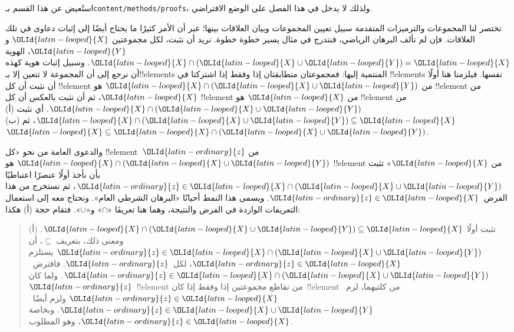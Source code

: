 \documentclass[../../../include/open-logic-section]{subfiles}
\begin{document}

\begin{editorial}
استُعيض عن هذا القسم بـ\verb|content/methods/proofs|، ولذلك لا يدخل في
هذا الفصل على الوضع الافتراضي.
\end{editorial}

\begin{explain}
تختصر لنا المجموعات والترميزات المتقدمة سبيل تعيين المجموعات وبيان
العلاقات بينها؛ غير أن الأمر كثيرًا ما يحتاج أيضًا إلى إثبات دعاوى في
تلك العلاقات. فإن لم تألف البرهان الرياضي، فنتدرج في مثال يسير خطوة
خطوة. نريد أن نثبت، لكل مجموعتين $\OLId{latin-looped}{X}$ و$\OLId{latin-looped}{Y}$، الهوية
$\OLId{latin-looped}{X} \cap (\OLId{latin-looped}{X} \cup \OLId{latin-looped}{Y}) = \OLId{latin-looped}{X}$. وسبيل إثبات هوية كهذه أن نرجع إلى أن المجموعة
لا تتعين إلا بـ!!{element}s المنتمية إليها: فمجموعتان متطابقتان إذا وفقط
إذا اشتركتا في !!{element}s نفسها. فيلزمنا هنا أولًا أن نثبت أن كل
!!{element} من $\OLId{latin-looped}{X} \cap (\OLId{latin-looped}{X} \cup \OLId{latin-looped}{Y})$ هو !!{element} من $\OLId{latin-looped}{X}$، ثم أن نثبت
بالعكس أن كل !!{element} من $\OLId{latin-looped}{X}$ هو !!{element} من
$\OLId{latin-looped}{X} \cap (\OLId{latin-looped}{X} \cup \OLId{latin-looped}{Y})$. أي نثبت (أ)
$\OLId{latin-looped}{X} \cap (\OLId{latin-looped}{X} \cup \OLId{latin-looped}{Y}) \subseteq \OLId{latin-looped}{X}$، ثم (ب) $\OLId{latin-looped}{X} \subseteq \OLId{latin-looped}{X} \cap (\OLId{latin-looped}{X} \cup \OLId{latin-looped}{Y})$.

والدعوى العامة من نحو «كل !!{element}~$\OLId{latin-ordinary}{z}$ من $\OLId{latin-looped}{X} \cap (\OLId{latin-looped}{X}
\cup \OLId{latin-looped}{Y})$ هو !!{element} من $\OLId{latin-looped}{X}$» تثبت بأن نأخذ أولًا عنصرًا اعتباطيًا
$\OLId{latin-ordinary}{z} \in \OLId{latin-looped}{X} \cap (\OLId{latin-looped}{X} \cup \OLId{latin-looped}{Y})$، ثم نستخرج من هذا الفرض~$\OLId{latin-ordinary}{z} \in \OLId{latin-looped}{X}$. ويسمى
هذا النمط أحيانًا «البرهان الشرطي العام». ونحتاج معه إلى استعمال
التعريفات الواردة في الفرض والنتيجة، وهما هنا تعريفَا «$\cap$» و«$\cup$».
فتقام حجة (أ) هكذا:

\begin{quote}
(أ) نثبت أولًا $\OLId{latin-looped}{X} \cap (\OLId{latin-looped}{X} \cup \OLId{latin-looped}{Y}) \subseteq \OLId{latin-looped}{X}$. ومعنى ذلك، بتعريف
$\subseteq$، أن $\OLId{latin-ordinary}{z} \in \OLId{latin-looped}{X} \cap (\OLId{latin-looped}{X} \cup \OLId{latin-looped}{Y})$ يستلزم
$\OLId{latin-ordinary}{z} \in \OLId{latin-looped}{X}$، لكل~$\OLId{latin-ordinary}{z}$. فافترض~$\OLId{latin-ordinary}{z} \in \OLId{latin-looped}{X} \cap (\OLId{latin-looped}{X} \cup \OLId{latin-looped}{Y})$. ولما كان
$\OLId{latin-ordinary}{z}$~!!{element} من تقاطع مجموعتين إذا وفقط إذا كان~!!{element} من
  كلتيهما، لزم~$\OLId{latin-ordinary}{z} \in \OLId{latin-looped}{X}$ ولزم أيضًا~$\OLId{latin-ordinary}{z} \in \OLId{latin-looped}{X} \cup \OLId{latin-looped}{Y}$. وبخاصة
$\OLId{latin-ordinary}{z} \in \OLId{latin-looped}{X}$، وهو المطلوب.
\end{quote}


\end{explain}
\end{document}
